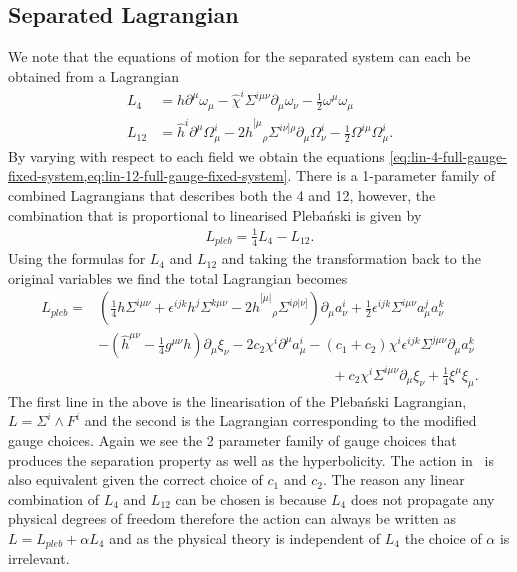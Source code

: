\documentclass[10pt]{report}
\newcommand{\pleb}[0]{Pleba\'nski}
\theoremstyle{definition}
\begin{document}
    \subsection{Separated Lagrangian}
        We note that the equations of motion for the separated system can each be obtained from a Lagrangian
        \begin{align}
            L_4 &= h \partial^\mu \omega_\mu - \hat{\chi}^i \Sigma^{i\mu\nu} \partial_\mu \omega_\nu  - \frac{1}{2} \omega^\mu \omega_\mu \label{eq:lin-4-action} \\ L_{12} &= \hat{h}^i \partial^\mu \Omega^i_\mu - 2 \hat{h}^{[\mu}{}_\rho \Sigma^{i\nu]\rho} \partial_\mu \Omega^i_\nu - \frac{1}{2} \Omega^{i\mu} \Omega^i_\mu. \label{eq:lin-12-action}
        \end{align}
        By varying with respect to each field we obtain the equations \cref{eq:lin-4-full-gauge-fixed-system,eq:lin-12-full-gauge-fixed-system}.
        There is a 1-parameter family of combined Lagrangians that describes both the 4 and 12, however, the combination that is proportional to linearised \pleb{} is given by 
        \begin{align}
            L_{pleb} = \frac{1}{4} L_4 - L_{12}.
        \end{align}
        Using the formulas for $L_4$ and $L_{12}$ and taking the transformation back to the original variables we find the total Lagrangian becomes 
        \begin{align}
            L_{pleb} = &  \left( \frac{1}{4} h \Sigma^{i\mu\nu} + \epsilon^{ijk} h^j \Sigma^{k\mu\nu} - 2 \hat{h}^{[\mu|}{}_\rho \Sigma^{i\rho|\nu]} \right) \partial_\mu a^i_\nu + \frac{1}{2} \epsilon^{ijk} \Sigma^{i\mu\nu} a^j_\mu a^k_\nu\nonumber\\
            & -\left(\hat{h}^{\mu\nu} - \frac{1}{4} g^{\mu\nu} h\right) \partial_\mu \xi_\nu - 2 c_2 \chi^i  \partial^\mu a^i_\mu - (c_1 + c_2) \chi^i \epsilon^{ijk} \Sigma^{j\mu\nu} \partial_\mu a^k_\nu \nonumber \\ & \hspace{200pt} + c_2 \chi^i \Sigma^{i\mu\nu} \partial_\mu \xi_\nu + \frac{1}{4} \xi^\mu \xi_\mu. \label{eq:lin-gauge-fixed-plebanski-action-in-original-variables}
        \end{align}
        The first line in the above is the linearisation of the \pleb{} Lagrangian, $L = \Sigma^i \wedge F^i$ and the second is the Lagrangian corresponding to the modified gauge choices. Again we see the 2 parameter family of gauge choices that produces the separation property as well as the hyperbolicity. The action in~\cite{Plebanski_compl_Krasno_2025} is also equivalent given the correct choice of $c_1$ and $c_2$. The reason any linear combination of $L_4$ and $L_{12}$ can be chosen is because $L_4$ does not propagate any physical degrees of freedom therefore the action can always be written as $L = L_{pleb} + \alpha L_4$ and as the physical theory is independent of $L_4$ the choice of $\alpha$ is irrelevant.
\end{document}
